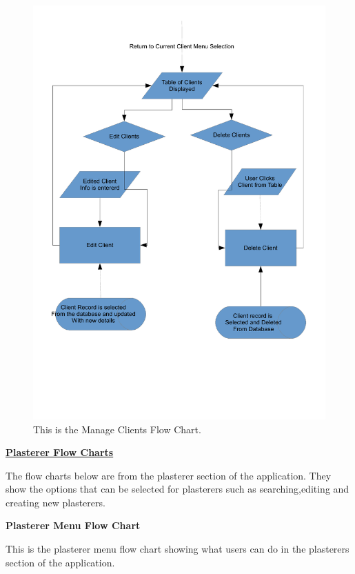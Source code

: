 \begin{figure}[H]
\includegraphics[scale=0.5]{./Design/images/FlowChartManageClients.pdf}
    \caption{This is the Manage Clients Flow Chart.} 
\label{fig:FlowChartSearchClients}
\end{figure}




\pagebreak
\underline{\textbf{Plasterer Flow Charts}}
\par
\begin{flushleft}
The flow charts below are from the plasterer section of the application. They show the options that can be selected for plasterers such as searching,editing and creating new plasterers.
\end{flushleft}

\textbf{Plasterer Menu Flow Chart}
\begin{flushleft}
This is the plasterer menu flow chart showing what users can do in the plasterers section of the application.
\end{flushleft}

